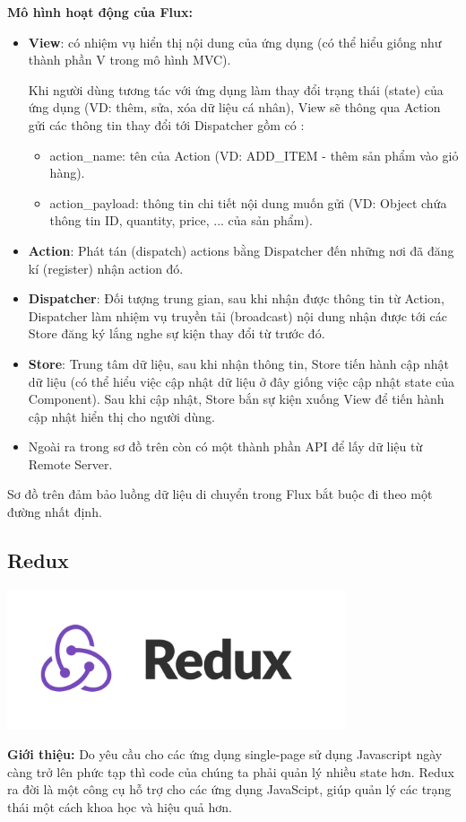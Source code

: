 \textbf{Mô hình hoạt động của Flux:}
\begin{itemize}
    \item \textbf{View}: có nhiệm vụ hiển thị nội dung của ứng dụng (có thể hiểu giống như thành phần V trong mô hình MVC).
    
    Khi người dùng tương tác với ứng dụng làm thay đổi trạng thái (state) của ứng dụng (VD: thêm, sửa, xóa dữ liệu cá nhân), View sẽ thông qua Action gửi các thông tin thay đổi tới Dispatcher gồm có :
    \begin{itemize}
        \item action\_name: tên của Action (VD: ADD\_ITEM - thêm sản phẩm vào giỏ hàng).
        \item action\_payload: thông tin chi tiết nội dung muốn gửi (VD: Object chứa thông tin ID, quantity, price, ... của sản phẩm).
    \end{itemize}
    \item \textbf{Action}: Phát tán (dispatch) actions bằng Dispatcher đến những nơi đã đăng kí (register) nhận action đó.
    \item \textbf{Dispatcher}: Đối tượng trung gian, sau khi nhận được thông tin từ Action, Dispatcher làm nhiệm vụ truyền tải (broadcast) nội dung nhận được tới các Store đăng ký lắng nghe sự kiện thay đổi từ trước đó.
    \item \textbf{Store}: Trung tâm dữ liệu, sau khi nhận thông tin, Store tiến hành cập nhật dữ liệu (có thể hiểu việc cập nhật dữ liệu ở đây giống việc cập nhật state của Component). Sau khi cập nhật, Store bắn sự kiện xuống View để tiến hành cập nhật hiển thị cho người dùng.
    \item Ngoài ra trong sơ đồ trên còn có một thành phần API để lấy dữ liệu từ Remote Server.
\end {itemize}
Sơ đồ trên đảm bảo luồng dữ liệu di chuyển trong Flux bắt buộc đi theo một đường nhất định.

\subsection{Redux}
\begin{center}
  \captionsetup{type=figure}
  \includegraphics[width=10cm]{img/redux-logo.png}
\end{center}
\textbf{Giới thiệu:}
Do yêu cầu cho các ứng dụng single-page sử dụng Javascript ngày càng trở lên phức tạp thì code của chúng ta phải quản lý nhiều state hơn. Redux ra đời là một công cụ hỗ trợ cho các ứng dụng JavaScipt, giúp quản lý các trạng thái một cách khoa học và hiệu quả hơn.

